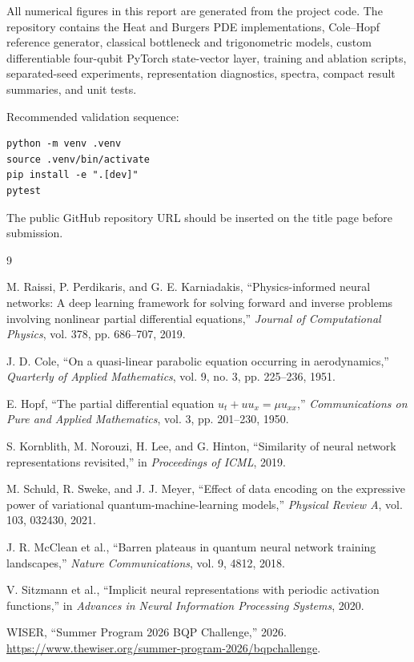 \documentclass[10pt,a4paper]{article}
\begin{document}
All numerical figures in this report are generated from the project code. The repository contains the Heat and Burgers PDE implementations, Cole--Hopf reference generator, classical bottleneck and trigonometric models, custom differentiable four-qubit PyTorch state-vector layer, training and ablation scripts, separated-seed experiments, representation diagnostics, spectra, compact result summaries, and unit tests.

Recommended validation sequence:
\begin{verbatim}
python -m venv .venv
source .venv/bin/activate
pip install -e ".[dev]"
pytest
\end{verbatim}
The public GitHub repository URL should be inserted on the title page before submission.

\begin{thebibliography}{9}

M. Raissi, P. Perdikaris, and G. E. Karniadakis,
``Physics-informed neural networks: A deep learning framework for solving forward and inverse problems involving nonlinear partial differential equations,''
\emph{Journal of Computational Physics}, vol. 378, pp. 686--707, 2019.

J. D. Cole,
``On a quasi-linear parabolic equation occurring in aerodynamics,''
\emph{Quarterly of Applied Mathematics}, vol. 9, no. 3, pp. 225--236, 1951.

E. Hopf,
``The partial differential equation $u_t+uu_x=\mu u_{xx}$,''
\emph{Communications on Pure and Applied Mathematics}, vol. 3, pp. 201--230, 1950.

S. Kornblith, M. Norouzi, H. Lee, and G. Hinton,
``Similarity of neural network representations revisited,''
in \emph{Proceedings of ICML}, 2019.

M. Schuld, R. Sweke, and J. J. Meyer,
``Effect of data encoding on the expressive power of variational quantum-machine-learning models,''
\emph{Physical Review A}, vol. 103, 032430, 2021.

J. R. McClean et al.,
``Barren plateaus in quantum neural network training landscapes,''
\emph{Nature Communications}, vol. 9, 4812, 2018.

V. Sitzmann et al.,
``Implicit neural representations with periodic activation functions,''
in \emph{Advances in Neural Information Processing Systems}, 2020.

WISER,
``Summer Program 2026 BQP Challenge,'' 2026.
\url{https://www.thewiser.org/summer-program-2026/bqpchallenge}.

\end{thebibliography}
\end{document}
